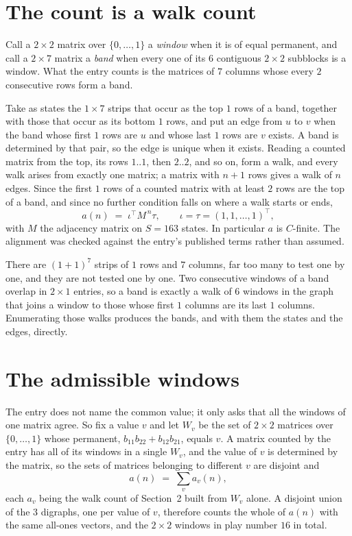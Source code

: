 \documentclass[11pt,a4paper]{article}
\theoremstyle{plain}
\theoremstyle{definition}
\begin{document}
\section{The count is a walk count}

Call a $2\times2$ matrix over $\{0,\dots,1\}$ a \emph{window} when it is of equal permanent, and
call a $2\times7$ matrix a \emph{band} when every one of its $6$ contiguous
$2\times2$ subblocks is a window. What the entry counts is the matrices of $7$ columns
whose every $2$ consecutive rows form a band.

Take as states the $1\times7$ strips that occur as the top $1$ rows of a band,
together with those that occur as its bottom $1$ rows, and put an edge from $u$ to $v$
when the band whose first $1$ rows are $u$ and whose last $1$ rows are $v$ exists.
A band is determined by that pair, so the edge is unique when it exists. Reading a counted
matrix from the top, its rows $1..1$, then $2..2$, and so on, form a walk, and every
walk arises from exactly one matrix; a matrix with $n+1$ rows gives a walk of $n$ edges.
Since the first $1$ rows of a counted matrix with at least $2$ rows are the top of a
band, and since no further condition falls on where a walk starts or ends,
\[
a(n)\;=\;\iota^{\!\top}M^{\,n}\tau ,\qquad \iota=\tau=(1,1,\dots,1)^{\!\top},
\]
with $M$ the adjacency matrix on $S=163$ states. In particular $a$ is $C$-finite. The
alignment was checked against the entry's published terms rather than assumed.

There are $(1 + 1)^{7}$ strips of $1$ rows and $7$ columns, far too
many to test one by one, and they are not tested one by one. Two consecutive windows of a band
overlap in $2\times1$ entries, so a band is exactly a walk of $6$ windows in
the graph that joins a window to those whose first $1$ columns are its last $1$
columns. Enumerating those walks produces the bands, and with them the states and the edges,
directly.

\section{The admissible windows}

The entry does not name the common value; it only asks that all the windows of one matrix agree.
So fix a value $v$ and let $W_v$ be the set of $2\times2$ matrices over
$\{0,\dots,1\}$ whose permanent, $b_{11}b_{22}+b_{12}b_{21}$, equals $v$. A matrix counted by the entry has all of
its windows in a single $W_v$, and the value of $v$ is determined by the matrix, so the sets of
matrices belonging to different $v$ are disjoint and
\[
a(n)\;=\;\sum_v a_v(n),
\]
each $a_v$ being the walk count of Section~2 built from $W_v$ alone. A disjoint union of the
$3$ digraphs, one per value of $v$, therefore counts the whole of $a(n)$ with the same
all-ones vectors, and the $2\times2$ windows in play number $16$ in total.
\end{document}

